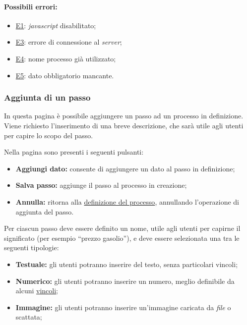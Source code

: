 \paragraph*{Possibili errori:}
\begin{itemize}
\item \hyperref[e1]{E1}: \textit{javascript} disabilitato;
\item \hyperref[e3]{E3}: errore di connessione al \textit{server};
\item \hyperref[e4]{E4}: nome processo già utilizzato;
\item \hyperref[e5]{E5}: dato obbligatorio mancante.
\end{itemize}

\subsubsection{Aggiunta di un passo}
\label{addstep}

In questa pagina è possibile aggiungere un passo ad un processo in definizione.
Viene richiesto l'inserimento di una breve descrizione, che sarà utile agli utenti per capire lo scopo del passo.

Nella pagina sono presenti i seguenti pulsanti:
\begin{itemize}
\item \textbf{Aggiungi dato:} consente di aggiungere un dato al passo in definizione;
\item \textbf{Salva passo:} aggiunge il passo al processo in creazione;
\item \textbf{Annulla:} ritorna alla \hyperref[newprocess]{definizione del processo}, annullando l'operazione di aggiunta del passo.
\end{itemize}

Per ciascun passo deve essere definito un nome, utile agli utenti per capirne il significato (per esempio ``prezzo gasolio''), e deve essere selezionata una tra le seguenti tipologie:
\begin{itemize}
\item \textbf{Testuale:} gli utenti potranno inserire del testo, senza particolari vincoli;
\item \textbf{Numerico:} gli utenti potranno inserire un numero, meglio definibile da alcuni \hyperref[vincoli]{vincoli};
\item \textbf{Immagine:} gli utenti potranno inserire un'immagine caricata da \textit{file} o scattata;
\end{itemize}

